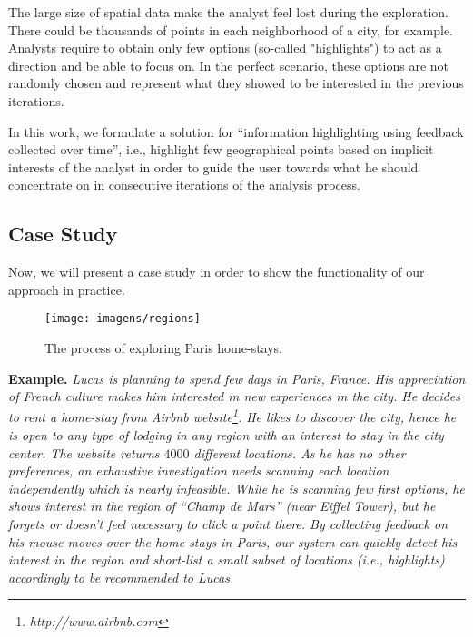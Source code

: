 The large size of spatial data make the analyst feel lost during the exploration. There could be thousands of points in each neighborhood of a city, for example. Analysts require to obtain only few options (so-called "highlights") to act as a direction and be able to focus on. In the perfect scenario, these options are not randomly chosen and represent what they showed to be interested in the previous iterations.

In this work, we formulate a solution for ``information highlighting using feedback collected over time'', i.e., highlight few geographical points based on implicit interests of the analyst in order to guide the user towards what he should concentrate on in consecutive iterations of the analysis process.


\subsection{Case Study}

Now, we will present a case study in order to show the functionality of our approach in practice.

\begin{figure}[t]
	\centering
	\texttt{[image: imagens/regions]}
	\caption{The process of exploring Paris home-stays.}
	\label{fig:regions}
\end{figure}

{\bf Example.} {\em Lucas is planning to spend few days in Paris, France. His appreciation of French culture makes him interested in new experiences in the city. He decides to rent a home-stay from Airbnb website\footnote{\it http://www.airbnb.com}. He likes to discover the city, hence he is open to any type of lodging in any region with an interest to stay in the city center. The website returns $4000$ different locations. As he has no other preferences, an exhaustive investigation needs scanning each location independently which is nearly infeasible. While he is scanning few first options, he shows interest in the region of ``Champ de Mars'' (near Eiffel Tower), but he forgets or doesn't feel necessary to click a point there. By collecting feedback on his mouse moves over the home-stays in Paris, our system can quickly detect his interest in the region and short-list a small subset of locations (i.e., highlights) accordingly to be recommended to Lucas.}

